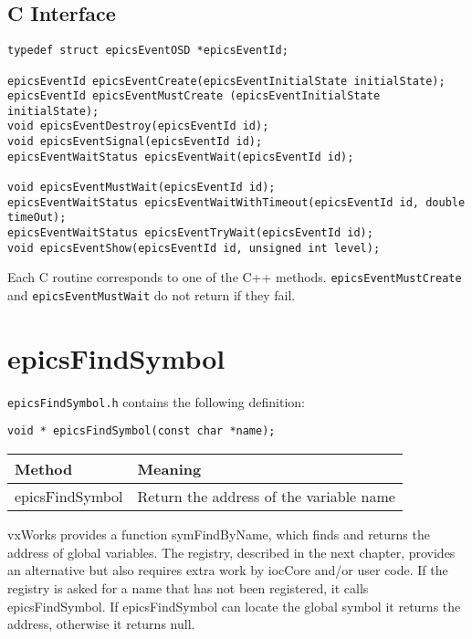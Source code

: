 \subsection{C Interface}

\begin{verbatim}
typedef struct epicsEventOSD *epicsEventId;

epicsEventId epicsEventCreate(epicsEventInitialState initialState);
epicsEventId epicsEventMustCreate (epicsEventInitialState initialState);
void epicsEventDestroy(epicsEventId id);
void epicsEventSignal(epicsEventId id);
epicsEventWaitStatus epicsEventWait(epicsEventId id);

void epicsEventMustWait(epicsEventId id);
epicsEventWaitStatus epicsEventWaitWithTimeout(epicsEventId id, double timeOut);
epicsEventWaitStatus epicsEventTryWait(epicsEventId id);
void epicsEventShow(epicsEventId id, unsigned int level);
\end{verbatim}

Each C routine corresponds to one of the C++ methods. \verb|epicsEventMustCreate| and \verb|epicsEventMustWait| do 
not return if they fail.

\section{epicsFindSymbol}

\verb|epicsFindSymbol.h| contains the following definition:

\begin{verbatim}
void * epicsFindSymbol(const char *name);
\end{verbatim}

\begin{center}
\begin{longtable}{p{1.38889in}p{2.5in}}
\textbf{Method} & \textbf{Meaning}\\
\hline
epicsFindSymbol & Return the address of the variable name
\end{longtable}

\end{center}


vxWorks provides a function symFindByName, which finds and returns the address of global variables. The registry, 
described in the next chapter, provides an alternative but also requires extra work by iocCore and/or user code. If the 
registry is asked for a name that has not been registered, it calls epicsFindSymbol. If epicsFindSymbol can locate the 
global symbol it returns the address, otherwise it returns null.

